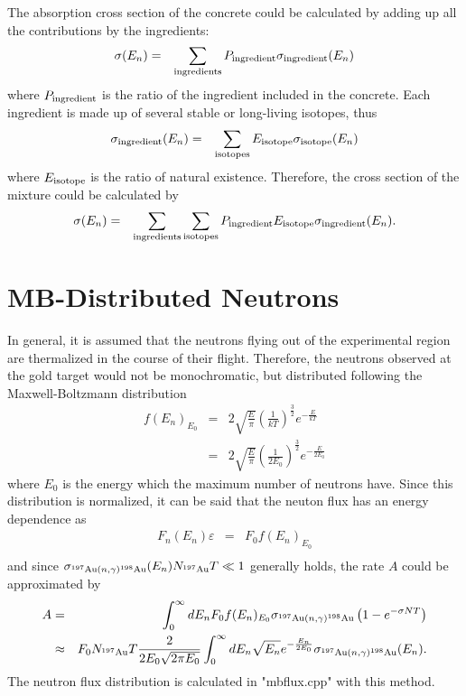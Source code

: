 \documentclass{article}
\begin{document}
The absorption cross section of the concrete could be calculated by adding up all the contributions by the ingredients:
\begin{eqnarray*}
\sigma(E_n) & = & \sum_{{\rm ingredients}} P_{{\rm ingredient}} \sigma_{{\rm ingredient}}(E_n)
\end{eqnarray*}
where $P_{{\rm ingredient}}$ is the ratio of the ingredient included in the concrete. Each ingredient is made up of several stable or long-living isotopes, thus
\begin{eqnarray*}
\sigma_{{\rm ingredient}}(E_n) & = & \sum_{{\rm isotopes}} E_{{\rm isotope}} \sigma_{{\rm isotope}}(E_n)
\end{eqnarray*}
where $E_{{\rm isotope}}$ is the ratio of natural existence. Therefore, the cross section of the mixture could be calculated by
\begin{eqnarray*}
\sigma(E_n) & = & \sum_{{\rm ingredients}} \sum_{{\rm isotopes}} P_{{\rm ingredient}} E_{{\rm isotope}} \sigma_{{\rm ingredient}}(E_n) .
\end{eqnarray*}


\section{MB-Distributed Neutrons}

In general, it is assumed that the neutrons flying out of the experimental region are thermalized in the course of their flight. Therefore, the neutrons observed at the gold target would not be monochromatic, but distributed following the Maxwell-Boltzmann distribution
\begin{eqnarray*}
f(E_n)_{E_0} & = & 2 \sqrt{\frac{E}{\pi}} \left( \frac{1}{kT} \right)^\frac{3}{2} e^{-\frac{E}{kT}} \\
& = & 2 \sqrt{\frac{E}{\pi}} \left( \frac{1}{2E_0} \right)^\frac{3}{2} e^{-\frac{E}{2E_0}}
\end{eqnarray*}
where $E_0$ is the energy which the maximum number of neutrons have. Since this distribution is normalized, it can be said that the neuton flux has an energy dependence as
\begin{eqnarray*}
F_{n}(E_n) \varepsilon & = & F_0 f(E_n)_{E_0} \\
\end{eqnarray*}
and since $\sigma_{^{197}{\rm Au}(n,\gamma)^{198}{\rm Au}}(E_n) N_{^{197}{\rm Au}} T \ll 1$ generally holds, the rate $A$ could be approximated by
\begin{eqnarray*}
A & = & \int_{0}^{\infty} dE_n F_0 f(E_n)_{E_0} \sigma_{^{197}{\rm Au}(n,\gamma)^{198}{\rm Au}} \left( 1 - e^{-\sigma N T} \right) \\
& \approx & F_0 N_{^{197}{\rm Au}}T \frac{2}{2E_0\sqrt{2\pi E_0}} \int_0^\infty dE_n \sqrt{E_n} e^{-\frac{E_n}{2E_0}} \sigma_{^{197}{\rm Au}(n,\gamma){^{198}{\rm Au}}} (E_n) .
\end{eqnarray*}
The neutron flux distribution is calculated in "mbflux.cpp" with this method.
\end{document}

